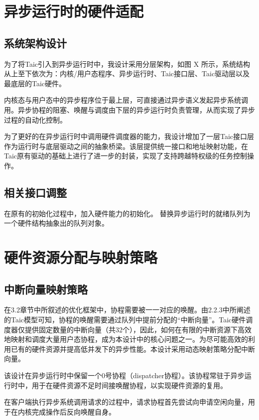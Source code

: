 \section{异步运行时的硬件适配}

\subsection{系统架构设计}

为了将Taic引入到异步运行时中，我设计采用分层架构，如图 X 所示，系统结构从上至下依次为：内核/用户态程序、异步运行时、Taic接口层、Taic驱动层以及最底层的Taic硬件。

内核态与用户态中的异步程序位于最上层，可直接通过异步语义发起异步系统调用。异步协程的阻塞、唤醒与调度由下层的异步运行时负责管理，从而实现了异步过程的自动化控制。

为了更好的在异步运行时中调用硬件调度器的能力，我设计增加了一层Taic接口层作为运行时与底层驱动之间的抽象桥梁。该层提供统一接口和地址映射功能，在Taic原有驱动的基础上进行了进一步的封装，实现了支持跨越特权级的任务控制操作。

\subsection{相关接口调整}

在原有的初始化过程中，加入硬件能力的初始化。
替换异步运行时的就绪队列为一个硬件结构抽象出的队列对象。

\section{硬件资源分配与映射策略}

\subsection{中断向量映射策略}

在3.2章节中所叙述的优化框架中，协程需要被一一对应的唤醒。由2.2.3中所阐述的Taic模型可知，协程的唤醒需要通过队列中提前分配的“中断向量”。Taic硬件调度器仅提供固定数量的中断向量（共32个），因此，如何在有限的中断资源下高效地映射和调度大量用户态协程，成为本设计中的核心问题之一。为尽可能高效的利用已有的硬件资源并提高低并发下的异步性能。本设计采用动态映射策略分配中断向量。

该设计在异步运行时中保留一个0号协程（dispatcher协程）。该协程常驻于异步运行时中，用于在硬件资源不足时间接唤醒协程，以实现硬件资源的复用。

在客户端执行异步系统调用请求的过程中，请求协程首先尝试向申请空闲向量，用于在内核完成操作后反向唤醒自身。

